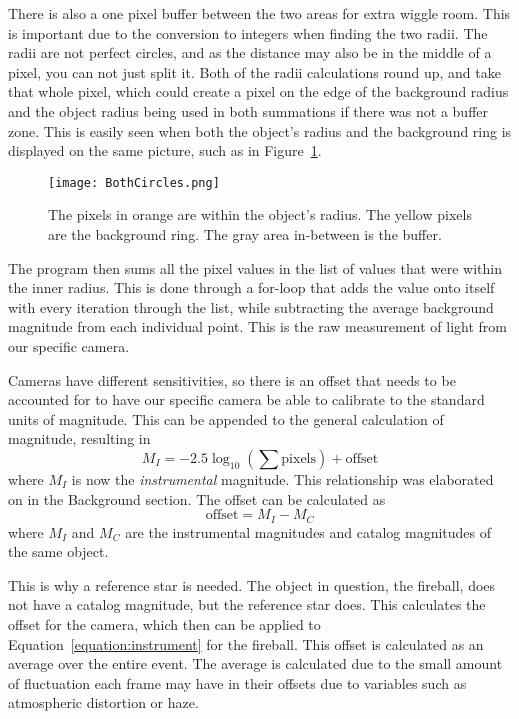 There is also a one pixel buffer between the two areas for extra wiggle room. This is important due to the conversion to integers when finding the two radii. The radii are not perfect circles, and as the distance may also be in the middle of a pixel, you can not just split it. Both of the radii calculations round up, and take that whole pixel, which could create a pixel on the edge of the background radius and the object radius being used in both summations if there was not a buffer zone. This is easily seen when both the object's radius and the background ring is displayed on the same picture, such as in Figure~\ref{fig:BothCircles}.

\begin{figure}[ht!]
	\centering
	\texttt{[image: BothCircles.png]}
	\caption{The pixels in orange are within the object's radius. The yellow pixels are the background ring. The gray area in-between is the buffer.}
	\label{fig:BothCircles}
\end{figure}

The program then sums all the pixel values in the list of values that were within the inner radius. This is done through a for-loop that adds the value onto itself with every iteration through the list, while subtracting the average background magnitude from each individual point. This is the raw measurement of light from our specific camera.

Cameras have different sensitivities, so there is an offset that needs to be accounted for to have our specific camera be able to calibrate to the standard units of magnitude. This can be appended to the general calculation of magnitude, resulting in 
\begin{equation}
	M_I = -2.5 \log_{10}\left( \sum \text{pixels}\right) + \text{offset}
	\label{equation:instrument}
\end{equation}
where $M_I$ is now the \textit{instrumental} magnitude. This relationship was elaborated on in the Background section. The offset can be calculated as
\begin{equation}
	\text{offset} = M_I - M_C
	\label{equation:offset}
\end{equation}
where $M_I$ and $M_C$ are the instrumental magnitudes and catalog magnitudes of the same object.

This is why a reference star is needed. The object in question, the fireball, does not have a catalog magnitude, but the reference star does. This calculates the offset for the camera, which then can be applied to Equation~\ref{equation:instrument} for the fireball. This offset is calculated as an average over the entire event. The average is calculated due to the small amount of fluctuation each frame may have in their offsets due to variables such as atmospheric distortion or haze.

